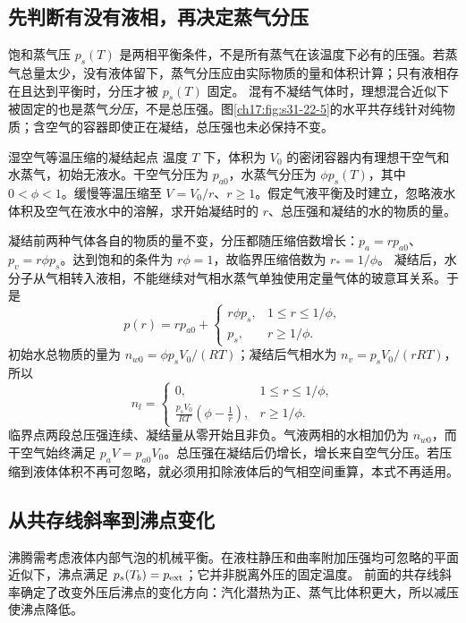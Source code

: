 \subsection{先判断有没有液相，再决定蒸气分压}
饱和蒸气压 $p_s(T)$ 是两相平衡条件，不是所有蒸气在该温度下必有的压强。若蒸气总量太少，没有液体留下，蒸气分压应由实际物质的量和体积计算；只有液相存在且达到平衡时，分压才被 $p_s(T)$ 固定。
混有不凝结气体时，理想混合近似下被固定的也是蒸气\emph{分压}，不是总压强。图\ref{ch17:fig:s31-22-5}的水平共存线针对纯物质；含空气的容器即使正在凝结，总压强也未必保持不变。

\begin{origexamplebox}{湿空气等温压缩的凝结起点}\label{ch17:ex:teaching-condensation}
温度 $T$ 下，体积为 $V_0$ 的密闭容器内有理想干空气和水蒸气，初始无液水。干空气分压为 $p_{a0}$，水蒸气分压为 $\phi p_s(T)$，其中 $0<\phi<1$。缓慢等温压缩至 $V=V_0/r$、$r\ge1$。假定气液平衡及时建立，忽略液水体积及空气在液水中的溶解，求开始凝结时的 $r$、总压强和凝结的水的物质的量。
\end{origexamplebox}
\begin{xesolution}
凝结前两种气体各自的物质的量不变，分压都随压缩倍数增长：$p_a=rp_{a0}$、$p_v=r\phi p_s$。达到饱和的条件为 $r\phi=1$，故临界压缩倍数为 $r_*=1/\phi$。
凝结后，水分子从气相转入液相，不能继续对气相水蒸气单独使用定量气体的玻意耳关系。于是
\[
 p(r)=rp_{a0}+\begin{cases}r\phi p_s,&1\le r\le1/\phi,\\p_s,&r\ge1/\phi.\end{cases}
\]
初始水总物质的量为 $n_{w0}=\phi p_sV_0/(RT)$；凝结后气相水为 $n_v=p_sV_0/(rRT)$，所以
\[
 n_l=\begin{cases}0,&1\le r\le1/\phi,\\
 \displaystyle\frac{p_sV_0}{RT}\left(\phi-\frac1r\right),&r\ge1/\phi.
 \end{cases}
\]
临界点两段总压强连续、凝结量从零开始且非负。气液两相的水相加仍为 $n_{w0}$，而干空气始终满足 $p_aV=p_{a0}V_0$。总压强在凝结后仍增长，增长来自空气分压。若压缩到液体体积不再可忽略，就必须用扣除液体后的气相空间重算，本式不再适用。
\end{xesolution}

\subsection{从共存线斜率到沸点变化}
沸腾需考虑液体内部气泡的机械平衡。在液柱静压和曲率附加压强均可忽略的平面近似下，沸点满足 $p_s(T_b)=p_{\rm ext}$；它并非脱离外压的固定温度。
前面的共存线斜率确定了改变外压后沸点的变化方向：汽化潜热为正、蒸气比体积更大，所以减压使沸点降低。

